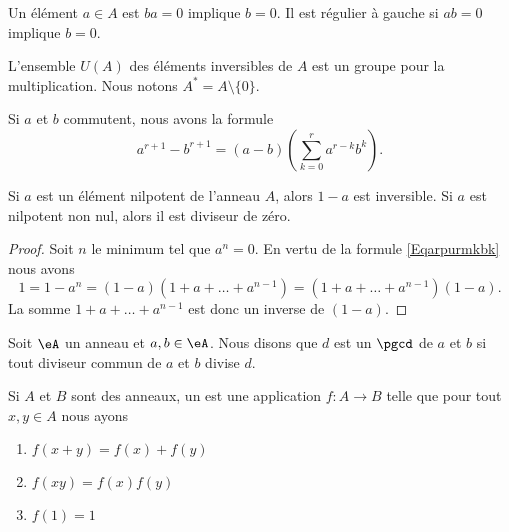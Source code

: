 Un élément \( a\in A\) est  \( ba=0\) implique \( b=0\). Il est régulier à gauche si \( ab=0\) implique \( b=0\).

L'ensemble \( U(A)\) des éléments inversibles de \( A\) est un groupe pour la multiplication. Nous notons \( A^*=A\setminus\{ 0 \}\).

\begin{lemma}
    Si \( a\) et \( b\) commutent, nous avons la formule
    \begin{equation}        \label{Eqarpurmkbk}
        a^{r+1}-b^{r+1}=(a-b)(\sum_{k=0}^ra^{r-k}b^k).
    \end{equation}
\end{lemma}

\begin{proposition}
    Si \( a\) est un élément nilpotent de l'anneau \( A\), alors \( 1-a\) est inversible. Si \( a\) est nilpotent non nul, alors il est diviseur de zéro.
\end{proposition}

\begin{proof}
    Soit \( n\) le minimum tel que \( a^n=0\). En vertu de la formule \eqref{Eqarpurmkbk} nous avons
    \begin{equation}
        1=1-a^n=(1-a)(1+a+\ldots+a^{n-1})=(1+a+\ldots+a^{n-1})(1-a).
    \end{equation}
    La somme \( 1+a+\ldots+a^{n-1}\) est donc un inverse de \( (1-a)\).
\end{proof}

\begin{definition}
    Soit \( \eA\) un anneau et \( a,b\in \eA\). Nous disons que \( d\) est un \( \pgcd\) de \( a\) et \( b\) si tout diviseur commun de \( a\) et \( b\) divise \( d\).
\end{definition}

\begin{definition}
    Si \( A\) et \( B\) sont des anneaux, un  est une application \( f\colon A\to B\) telle que pour tout \( x,y\in A\) nous ayons
    \begin{enumerate}
        \item
            \( f(x+y)=f(x)+f(y)\)
        \item
            \( f(xy)=f(x)f(y)\)
        \item
            \( f(1)=1\)
    \end{enumerate}
\end{definition}


